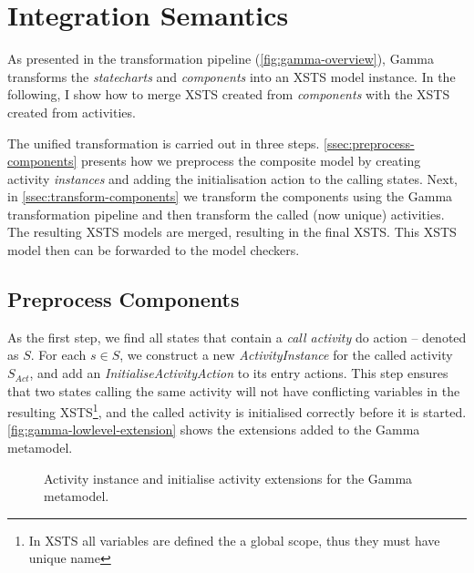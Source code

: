\section{Integration Semantics}\label{sec:integration-semantics}

As presented in the transformation pipeline (\autoref{fig:gamma-overview}), Gamma transforms the \emph{statecharts} and \emph{components} into an XSTS model instance. In the following, I show how to merge XSTS created from \emph{components} with the XSTS created from activities.

The unified transformation is carried out in three steps. \autoref{ssec:preprocess-components} presents how we preprocess the composite model by creating activity \emph{instances} and adding the initialisation action to the calling states. Next, in \autoref{ssec:transform-components} we transform the components using the Gamma transformation pipeline and then transform the called (now unique) activities. The resulting XSTS models are merged, resulting in the final XSTS. This XSTS model then can be forwarded to the model checkers.

\subsection{Preprocess Components}\label{ssec:preprocess-components}

As the first step, we find all states that contain a \emph{call activity} do action -- denoted as \( S \). For each \(s \in S\), we construct a new \emph{ActivityInstance} for the called activity \( S_\mathit{Act}\), and add an \emph{InitialiseActivityAction} to its entry actions. This step ensures that two states calling the same activity will not have conflicting variables in the resulting XSTS\footnote{In XSTS all variables are defined the a global scope, thus they must have unique name}, and the called activity is initialised correctly before it is started. \autoref{fig:gamma-lowlevel-extension} shows the extensions added to the Gamma metamodel.

\begin{figure}[!ht]
	\centering
	
	\caption{Activity instance and initialise activity extensions for the Gamma metamodel.}
	\label{fig:gamma-lowlevel-extension}
\end{figure}

